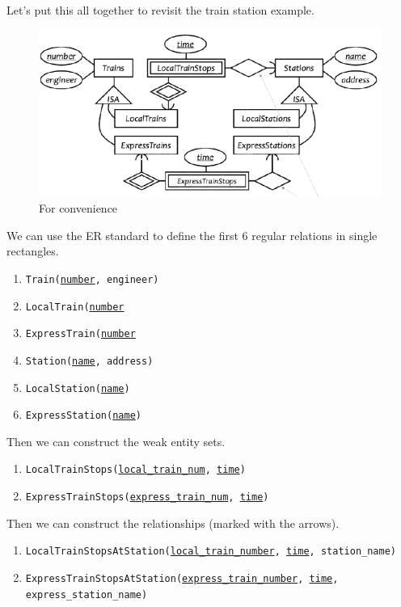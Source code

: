 \documentclass{article}
\begin{document}
    \begin{example}
      Let's put this all together to revisit the train station example. 
      \begin{figure}[H]
        \centering 
        \includegraphics[scale=0.4]{img/final_station.png}
        \caption{For convenience} 
        \label{fig:final_station}
      \end{figure}
      We can use the ER standard to define the first 6 regular relations in single rectangles.  
      \begin{enumerate}
        \item \texttt{Train(\underline{number}, engineer)}
        \item \texttt{LocalTrain(\underline{number}}
        \item \texttt{ExpressTrain(\underline{number}}
        \item \texttt{Station(\underline{name}, address)}
        \item \texttt{LocalStation(\underline{name})}
        \item \texttt{ExpressStation(\underline{name})}
      \end{enumerate}
      Then we can construct the weak entity sets. 
      \begin{enumerate}
        \item \texttt{LocalTrainStops(\underline{local\_train\_num}, \underline{time})}
        \item \texttt{ExpressTrainStops(\underline{express\_train\_num}, \underline{time})}
      \end{enumerate}
      Then we can construct the relationships (marked with the arrows).  
      \begin{enumerate}
        \item \texttt{LocalTrainStopsAtStation(\underline{local\_train\_number}, \underline{time}, station\_name)}
        \item \texttt{ExpressTrainStopsAtStation(\underline{express\_train\_number}, \underline{time}, express\_station\_name)}

\end{enumerate}
\end{example}
\end{document}
